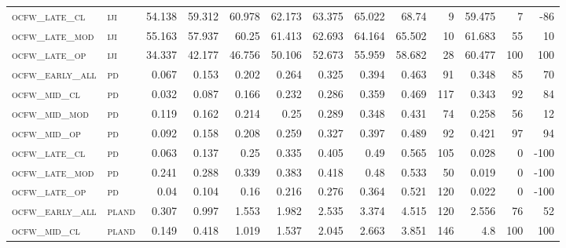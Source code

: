 \begin{landscape}
\begin{center}
\begin{footnotesize}
\begin{longtable}{llrrrrrrrr|rrr}
\textsc{ocfw\_late\_cl  } & \textsc{iji       }   & 54.138   & 59.312   & 60.978   & 62.173   & 63.375   & 65.022   & 68.74    & 9      & 59.475        & 7             & -86             \\
\textsc{ocfw\_late\_mod } & \textsc{iji       }   & 55.163   & 57.937   & 60.25    & 61.413   & 62.693   & 64.164   & 65.502   & 10     & 61.683        & 55            & 10              \\
\textsc{ocfw\_late\_op  } & \textsc{iji       }   & 34.337   & 42.177   & 46.756   & 50.106   & 52.673   & 55.959   & 58.682   & 28     & 60.477        & 100           & 100             \\
\textsc{ocfw\_early\_all} & \textsc{pd        }   & 0.067    & 0.153    & 0.202    & 0.264    & 0.325    & 0.394    & 0.463    & 91     & 0.348         & 85            & 70              \\
\textsc{ocfw\_mid\_cl   } & \textsc{pd        }   & 0.032    & 0.087    & 0.166    & 0.232    & 0.286    & 0.359    & 0.469    & 117    & 0.343         & 92            & 84              \\
\textsc{ocfw\_mid\_mod  } & \textsc{pd        }   & 0.119    & 0.162    & 0.214    & 0.25     & 0.289    & 0.348    & 0.431    & 74     & 0.258         & 56            & 12              \\
\textsc{ocfw\_mid\_op   } & \textsc{pd        }   & 0.092    & 0.158    & 0.208    & 0.259    & 0.327    & 0.397    & 0.489    & 92     & 0.421         & 97            & 94              \\
\textsc{ocfw\_late\_cl  } & \textsc{pd        }   & 0.063    & 0.137    & 0.25     & 0.335    & 0.405    & 0.49     & 0.565    & 105    & 0.028         & 0             & -100            \\
\textsc{ocfw\_late\_mod } & \textsc{pd        }   & 0.241    & 0.288    & 0.339    & 0.383    & 0.418    & 0.48     & 0.533    & 50     & 0.019         & 0             & -100            \\
\textsc{ocfw\_late\_op  } & \textsc{pd        }   & 0.04     & 0.104    & 0.16     & 0.216    & 0.276    & 0.364    & 0.521    & 120    & 0.022         & 0             & -100            \\
\textsc{ocfw\_early\_all} & \textsc{pland     }   & 0.307    & 0.997    & 1.553    & 1.982    & 2.535    & 3.374    & 4.515    & 120    & 2.556         & 76            & 52              \\
\textsc{ocfw\_mid\_cl   } & \textsc{pland     }   & 0.149    & 0.418    & 1.019    & 1.537    & 2.045    & 2.663    & 3.851    & 146    & 4.8           & 100           & 100             \\

\end{longtable}
\end{footnotesize}
\end{center}
\end{landscape}
